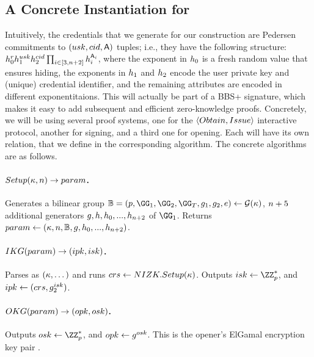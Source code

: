 
\subsection{A Concrete Instantiation for \GSAC}
\label{ssec:instantiation-gsac}

Intuitively, the credentials that we generate for our \GSAC construction are
Pedersen commitments to $(usk,cid,\mathsf{A})$ tuples; i.e., they have
the following structure: $h_0^rh_1^{usk}h_2^{cid}
\prod_{i \in [3,n+2]}h_i^{\mathsf{A}_i}$, where the exponent in
$h_0$ is a fresh random value that ensures hiding, the exponents in
$h_1$ and $h_2$ encode the user private key and (unique) credential
identifier, and the remaining attributes are encoded in different
exponentitaions. This will actually be part of a BBS+ signature, which makes it
easy to add subsequent and efficient zero-knowledge proofs. Concretely, we will
be using several \NIZK proof systems, one for the $\langle Obtain,Issue
\rangle$ interactive protocol, another for signing, and a third one for opening.
Each will have its own relation, that we define in the corresponding algorithm.
The concrete algorithms are as follows.

\paragraph{$Setup(\kappa,n) \rightarrow param$.} %
Generates a bilinear group $\BB = (p,\GG_1,\GG_2,\GG_T,\gen{g}_1,\gen{g}_2,e) \gets
\PGen(\secpar)$, $n+5$ additional generators $g,h,h_0,...,
h_{n+2}$ of $\GG_1$. Returns $param \gets
(\kappa,n,\mathbb{B},g,h_0,...,h_{n+2})$.

\paragraph{$IKG(param) \rightarrow (ipk,isk)$.} %
Parses \parm as $(\kappa,\dots)$ and runs $crs \gets NIZK.Setup(\kappa)$.
Outputs $\isk \gets \ZZ^*_p$, and $ipk \gets (crs,g_2^{isk})$.

\paragraph{$OKG(param) \rightarrow (opk,osk)$.} %
Outputs $\osk \gets \ZZ^*_p$, and $opk \gets g^{osk}$. This is the
opener's ElGamal encryption key pair \needcite.

